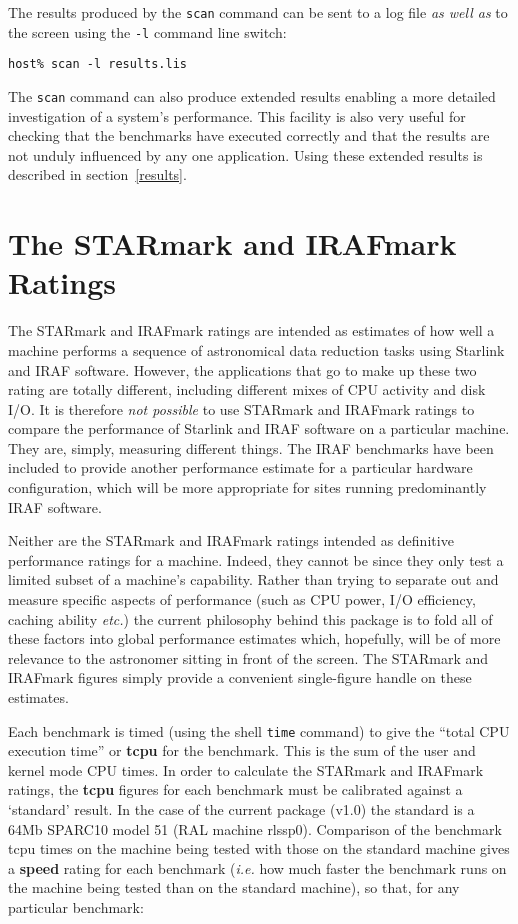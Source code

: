 \documentclass[11pt]{article}
\newcommand{\pkgver}     {v1.0}
\begin{document}
The results produced by the {\tt scan} command can be sent to a log file
{\em as well as} to the screen using the {\tt -l} command line switch:

{\tt host\% scan -l results.lis}

The {\tt scan} command can also produce extended results enabling a
more detailed investigation of a system's performance. This facility is
also very useful for checking that the benchmarks have executed correctly
and that the results are not unduly influenced by any one application.
Using these extended results is described in section~\ref{results}.

\newpage
\section{The STARmark and IRAFmark Ratings}
\label{starmark}

The STARmark and IRAFmark ratings are intended as estimates of how well a
machine performs a sequence of astronomical data reduction tasks using
Starlink and IRAF software. However, the applications that go to make up
these two rating are totally different, including different mixes of CPU
activity and disk I/O. It is therefore {\em not possible} to use STARmark
and IRAFmark ratings to compare the performance of Starlink and IRAF
software on a particular machine.  They are, simply, measuring different
things. The IRAF benchmarks have been included to provide another
performance estimate for a particular hardware configuration, which will
be more appropriate for sites running predominantly IRAF software.

Neither are the STARmark and IRAFmark ratings intended as definitive
performance ratings for a machine. Indeed, they cannot be since they
only test a limited subset of a machine's capability.  Rather than
trying to separate out and measure specific aspects of performance
(such as CPU power, I/O efficiency, caching ability {\em etc.}) the
current philosophy behind this package is to fold all of these factors
into global performance estimates which, hopefully, will be of more
relevance to the astronomer sitting in front of the screen.  The
STARmark and IRAFmark figures simply provide a convenient single-figure
handle on these estimates.

Each benchmark is timed (using the shell {\tt time} command) to give
the ``total CPU execution time'' or {\bf tcpu} for the benchmark. This
is the sum of the user and kernel mode CPU times. In order to calculate
the STARmark and IRAFmark ratings, the {\bf tcpu} figures for each
benchmark must be calibrated against a `standard' result.  In the case
of the current package (\pkgver) the standard is a 64Mb SPARC10 model
51 (RAL machine rlssp0). Comparison of the benchmark tcpu times on the
machine being tested with those on the standard machine gives a {\bf
speed} rating for each benchmark ({\em i.e.} how much faster the
benchmark runs on the machine being tested than on the standard
machine), so that, for any particular benchmark:
\end{document}
